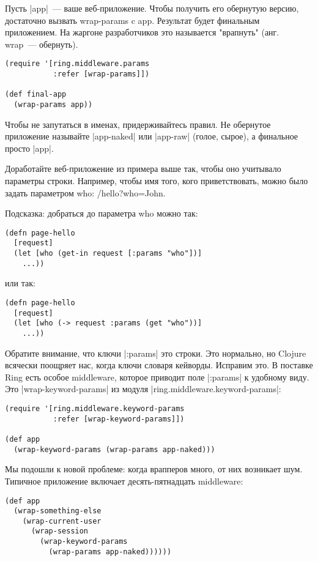 Пусть \spverb|app|~--- ваше веб-приложение. Чтобы получить его обернутую версию,
достаточно вызвать wrap-params c app. Результат будет финальным приложением. На
жаргоне разработчиков это называется "врапнуть" (анг. wrap~--- обернуть).

\begin{verbatim}
(require '[ring.middleware.params
           :refer [wrap-params]])

(def final-app
  (wrap-params app))
\end{verbatim}

Чтобы не запутаться в именах, придерживайтесь правил. Не обернутое приложение
называйте \spverb|app-naked| или \spverb|app-raw| (голое, сырое), а финальное просто \spverb|app|.

Доработайте веб-приложение из примера выше так, чтобы оно учитывало параметры
строки. Например, чтобы имя того, кого приветствовать, можно было задать
параметром who: /hello?who=John.

Подсказка: добраться до параметра who можно так:

\begin{verbatim}
(defn page-hello
  [request]
  (let [who (get-in request [:params "who"])]
    ...))
\end{verbatim}

или так:

\begin{verbatim}
(defn page-hello
  [request]
  (let [who (-> request :params (get "who"))]
    ...))
\end{verbatim}

Обратите внимание, что ключи \spverb|:params| это строки. Это нормально, но Clojure
всячески поощряет нас, когда ключи словаря кейворды. Исправим это. В поставке
Ring есть особое middleware, которое приводит поле \spverb|:params| к удобному
виду. Это \spverb|wrap-keyword-params| из модуля \spverb|ring.middleware.keyword-params|:

\begin{verbatim}
(require '[ring.middleware.keyword-params
           :refer [wrap-keyword-params]])

(def app
  (wrap-keyword-params (wrap-params app-naked)))
\end{verbatim}

Мы подошли к новой проблеме: когда врапперов много, от них возникает
шум. Типичное приложение включает десять-пятнадцать middleware:

\begin{verbatim}
(def app
  (wrap-something-else
    (wrap-current-user
      (wrap-session
        (wrap-keyword-params
          (wrap-params app-naked))))))
\end{verbatim}

